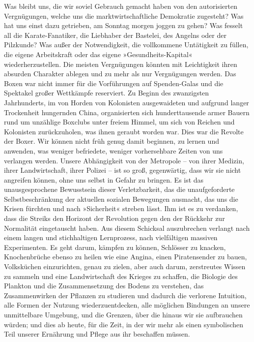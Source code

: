 Was bleibt uns, die wir soviel Gebrauch gemacht haben von den
autorisierten Vergnügungen, welche uns die marktwirtschaftliche
Demokratie zugesteht? Was hat uns einst dazu getrieben, am Sonntag
morgen joggen zu gehen? Was fesselt all die Karate-Fanatiker, die
Liebhaber der Bastelei, des Angelns oder der Pilzkunde? Was außer
der Notwendigkeit, die vollkommene Untätigkeit zu füllen, die
eigene Arbeitskraft oder das eigene »Gesundheits-Kapital«
wiederherzustellen. Die meisten Vergnügungen könnten mit
Leichtigkeit ihren absurden Charakter ablegen und zu mehr als nur
Vergnügungen werden. Das Boxen war nicht immer für die Vorführungen
auf Spenden-Galas und die Spektakel großer Wettkämpfe reserviert.
Zu Beginn des zwanzigsten Jahrhunderts, im von Horden von
Kolonisten ausgewaideten und aufgrund langer Trockenheit hungernden
China, organisierten sich hunderttausende armer Bauern rund um
unzählige Boxclubs unter freiem Himmel, um sich von Reichen und
Kolonisten zurückzuholen, was ihnen geraubt worden war. Dies war
die Revolte der Boxer. Wir können nicht früh genug damit beginnen,
zu lernen und anwenden, was weniger befriedete, weniger
vorhersehbare Zeiten von uns verlangen werden. Unsere Abhängigkeit
von der Metropole – von ihrer Medizin, ihrer Landwirtschaft, ihrer
Polizei – ist so groß, gegenwärtig, dass wir sie nicht angreifen
können, ohne uns selbst in Gefahr zu bringen. Es ist das
unausgesprochene Bewusstsein dieser Verletzbarkeit, das die
unaufgeforderte Selbstbeschränkung der aktuellen sozialen
Bewegungen ausmacht, das uns die Krisen fürchten und nach
»Sicherheit« streben lässt. Ihm ist es zu verdanken, dass die
Streiks den Horizont der Revolution gegen den der Rückkehr zur
Normalität eingetauscht haben. Aus diesem Schicksal auszubrechen
verlangt nach einem langen und stichhaltigen Lernprozess, nach
vielfältigen massiven Experimenten. Es geht darum, kämpfen zu
können, Schlösser zu knacken, Knochenbrüche ebenso zu heilen wie
eine Angina, einen Piratensender zu bauen, Volksküchen
einzurichten, genau zu zielen, aber auch darum, zerstreutes Wissen
zu sammeln und eine Landwirtschaft des Krieges zu schaffen, die
Biologie des Plankton und die Zusammensetzung des Bodens zu
verstehen, das Zusammenwirken der Pflanzen zu studieren und dadurch
die verlorene Intuition, alle Formen der Nutzung wiederzuentdecken,
alle möglichen Bindungen an unsere unmittelbare Umgebung, und die
Grenzen, über die hinaus wir sie aufbrauchen würden; und dies ab
heute, für die Zeit, in der wir mehr als einen symbolischen Teil
unserer Ernährung und Pflege aus ihr beschaffen müssen.

